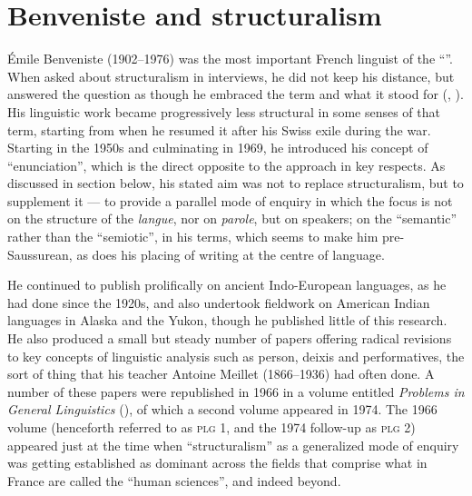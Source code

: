 \documentclass[output=paper]{langscibook}
\begin{document}
\section{Benveniste and structuralism}
\label{sec:joseph:bevenistestructuralism}

Émile Benveniste (1902--1976) was the most important French linguist of the ``''. When asked about structuralism in interviews, he did not keep his distance, but answered the question as though he embraced the term and what it stood for (\citealt{Benveniste1968langage}, \citealt{Benveniste1968structuralisme}). His linguistic work became progressively less structural in some senses of that term, starting from when he resumed it after his Swiss exile during the war. Starting in the 1950s and culminating in 1969, he introduced his concept of ``enunciation'', which is the direct opposite to the  approach in key respects. As discussed in section  below, his stated aim was not to replace structuralism, but to supplement it — to provide a parallel mode of enquiry in which the focus is not on the structure of the \emph{langue}, nor on \emph{parole}, but on speakers; on the ``semantic'' rather than the ``semiotic'', in his terms, which seems to make him pre-Saussurean, as does his placing of writing at the centre of language.

He continued to publish prolifically on ancient Indo-European languages, as he had done since the 1920s, and also undertook fieldwork on American Indian languages in Alaska and the Yukon, though he published little of this research. He also produced a small but steady number of papers offering radical revisions to key concepts of linguistic analysis such as person, deixis and performatives, the sort of thing that his teacher Antoine Meillet (1866--1936) had often done. A number of these papers were republished in 1966 in a volume entitled \emph{Problems in General Linguistics} (\citeyear{Benveniste196674}), of which a second volume appeared in 1974. The 1966 volume (henceforth referred to as \textsc{plg 1}, and the 1974 follow-up as \textsc{plg 2}) appeared just at the time when ``structuralism'' as a generalized mode of enquiry was getting established as dominant across the fields that comprise what in France are called the ``human sciences'', and indeed beyond.
\end{document}
